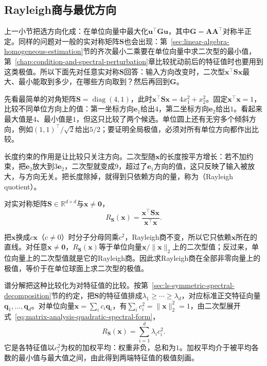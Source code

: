 \subsection{Rayleigh商与最优方向}
\label{sec:ls-quadratic-extrema}
\label{sec:ls-rayleigh-extremal}

上一小节把选方向化成：在单位向量中最大化$\bm u^\top\bm G\bm u$，其中$\bm G=\bm A\bm A^\top$对称半正定。同样的问题对一般的实对称矩阵$\bm S$也会出现：第~\ref{sec:linear-algebra-homogeneous-estimation}节的齐次最小二乘要在单位向量中求二次型的最小值，第~\ref{chap:condition-and-spectral-perturbation}章比较扰动前后的特征值时也要用到这类极值。所以下面先对任意实对称$\bm S$回答：输入方向改变时，二次型$\bm x^\top\bm S\bm x$最大、最小能取到多少，在哪些方向取到？然后再回到$\bm G$。

先看最简单的对角矩阵$\bm S=\operatorname{diag}(4,1)$，此时$\bm x^\top\bm S\bm x=4x_1^2+x_2^2$。固定$\bm x^\top\bm x=1$，比较不同单位方向上的值：第一坐标方向$\bm e_1$给出$4$，第二坐标方向$\bm e_2$给出$1$。看起来最大值是$4$、最小值是$1$，但这只比较了两个候选。单位圆上还有无穷多个倾斜方向，例如$(1,1)^\top/\sqrt2$给出$5/2$；要证明全局极值，必须对所有单位方向都作出比较。

长度约束的作用是让比较只关注方向。二次型随$\bm x$的长度按平方增长：若不加约束，把$\bm e_2$放大到$3\bm e_2$，二次型就变成$9$，超过了$\bm e_1$方向的值，这只反映了输入被放大，与方向无关。把长度除掉，就得到只依赖方向的量，称为（Rayleigh quotient）。
\begin{definition}[Rayleigh商]
\label{def:matrix-analysis-rayleigh-quotient}
对实对称矩阵$\bm S\in\mathbb R^{d\times d}$与$\bm x\neq\bm0$，
\begin{equation}
 R_{\bm S}(\bm x)=\frac{\bm x^\top\bm S\bm x}{\bm x^\top\bm x}.
 \label{eq:matrix-analysis-rayleigh-quotient}
\end{equation}
\end{definition}
把$\bm x$换成$c\bm x$（$c\neq0$）时分子分母同乘$c^2$，Rayleigh商不变，所以它只依赖$\bm x$所在的直线。对任意$\bm x\neq\bm0$，$R_{\bm S}(\bm x)$等于单位向量$\bm x/\lVert\bm x\rVert_2$上的二次型值；反过来，单位向量上的二次型值就是它的Rayleigh商。因此求Rayleigh商在全部非零向量上的极值，等价于在单位球面上求二次型的极值。

谱分解把这种比较化为对特征值的比较。按第~\ref{sec:ls-symmetric-spectral-decomposition}节的约定，把$\bm S$的特征值排成$\lambda_1\geq\cdots\geq\lambda_d$，对应标准正交特征向量$\bm q_1,\ldots,\bm q_d$。对单位向量$\bm x=\sum_ic_i\bm q_i$，有$\sum_ic_i^2=\lVert\bm x\rVert_2^2=1$，由二次型展开式~\eqref{eq:matrix-analysis-quadratic-spectral-form}，
\[
 R_{\bm S}(\bm x)=\sum_{i=1}^d\lambda_ic_i^2 .
\]
它是各特征值以$c_i^2$为权的加权平均：权重非负，总和为$1$。加权平均介于被平均各数的最小值与最大值之间，由此得到两端特征值的极值刻画。


